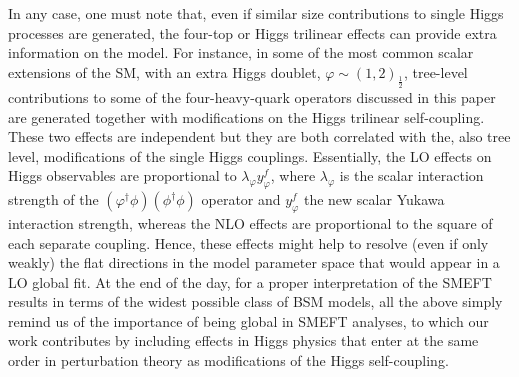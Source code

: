 %
In any case, one must note that, even if similar size contributions to single Higgs processes are generated, the four-top or Higgs trilinear effects can provide extra information on the model.
%
For instance, in some of the most common scalar extensions of the SM, with an extra Higgs doublet, $\varphi\sim (1,2)_{\frac 12}$, tree-level contributions to some of the four-heavy-quark operators discussed in this paper are generated together with modifications on the Higgs trilinear self-coupling.
These two effects are independent but they are both correlated with the, also tree level, modifications of the single Higgs couplings. Essentially, the LO effects on Higgs observables are proportional to $\lambda_\varphi y_\varphi^f$, where $\lambda_\varphi $ is the scalar interaction strength of the $(\varphi^\dagger \phi)(\phi^\dagger \phi)$ operator and $y_\varphi^f$ the new scalar Yukawa interaction strength, whereas the NLO effects are proportional to the square of each separate coupling. Hence, these effects might help to resolve (even if only weakly) the flat directions in the model parameter space that would appear in a LO global fit.
%
At the end of the day, for a proper interpretation of the SMEFT results in terms of the widest possible class of BSM models, all the above simply remind us of the importance of being global in SMEFT analyses, to which our work contributes by including effects in Higgs physics that enter at the same order in perturbation theory as modifications of the Higgs self-coupling.
